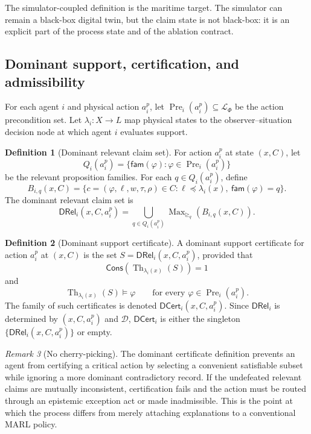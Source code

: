 \documentclass[11pt]{article}
\newcommand{\Lang}{\mathcal L}
\newcommand{\Cons}{\mathsf{Cons}}
\newcommand{\Fam}{\mathsf{fam}}
\newcommand{\DomRel}{\mathsf{DRel}}
\newcommand{\Th}{\operatorname{Th}}
\newcommand{\DCert}{\mathsf{DCert}}
\newcommand{\1}{\mathbf{1}}
\theoremstyle{definition}
\newtheorem{definition}{Definition}[section]
\theoremstyle{plain}
\theoremstyle{remark}
\newtheorem{remark}[definition]{Remark}
\begin{document}
The simulator-coupled definition is the maritime target. The simulator can remain a black-box digital twin, but the claim state is not black-box: it is an explicit part of the process state and of the ablation contract.

\subsection{Dominant support, certification, and admissibility}

For each agent $i$ and physical action $a_i^p$, let $\operatorname{Pre}_i(a_i^p)\subseteq\Lang_\Phi$ be the action precondition set. Let $\lambda_i:X\to L$ map physical states to the observer--situation decision node at which agent $i$ evaluates support.

\begin{definition}[Dominant relevant claim set]
\label{def:drel}
For action $a_i^p$ at state $(x,C)$, let
\[
Q_i(a_i^p)=\{\Fam(\varphi):\varphi\in\operatorname{Pre}_i(a_i^p)\}
\]
be the relevant proposition families. For each $q\in Q_i(a_i^p)$, define
\[
B_{i,q}(x,C)=
\{c=(\varphi,\ell,w,\tau,\rho)\in C:
\ell\preceq\lambda_i(x),\ \Fam(\varphi)=q\}.
\]
The dominant relevant claim set is
\[
\DomRel_i(x,C,a_i^p)
=
\bigcup_{q\in Q_i(a_i^p)}\operatorname{Max}_{\unrhd_q}(B_{i,q}(x,C)).
\]
\end{definition}

\begin{definition}[Dominant support certificate]
\label{def:certificate}
A dominant support certificate for action $a_i^p$ at $(x,C)$ is the set $S=\DomRel_i(x,C,a_i^p)$, provided that
\[
\Cons(\Th_{\lambda_i(x)}(S))=1
\]
and
\[
\Th_{\lambda_i(x)}(S)\models \varphi
\qquad\text{for every }\varphi\in\operatorname{Pre}_i(a_i^p).
\]
The family of such certificates is denoted $\DCert_i(x,C,a_i^p)$. Since $\DomRel_i$ is determined by $(x,C,a_i^p)$ and $\mathcal D$, $\DCert_i$ is either the singleton $\{\DomRel_i(x,C,a_i^p)\}$ or empty.
\end{definition}

\begin{remark}[No cherry-picking]
The dominant certificate definition prevents an agent from certifying a critical action by selecting a convenient satisfiable subset while ignoring a more dominant contradictory record. If the undefeated relevant claims are mutually inconsistent, certification fails and the action must be routed through an epistemic exception act or made inadmissible. This is the point at which the process differs from merely attaching explanations to a conventional MARL policy.
\end{remark}
\end{document}
